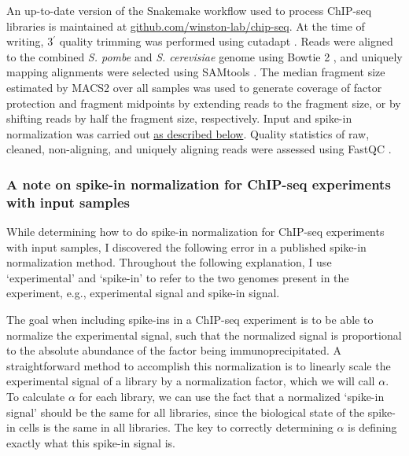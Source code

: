 An up-to-date version of the Snakemake \citep{koster2012} workflow used to process ChIP-seq libraries is maintained at \href{https://github.com/winston-lab/chip-seq}{github.com/winston-lab/chip-seq}.
At the time of writing, 3$^\prime$ quality trimming was performed using cutadapt \citep{martin2011}.
Reads were aligned to the combined \textit{S. pombe} and \textit{S. cerevisiae} genome using Bowtie 2 \citep{langmead2012}, and uniquely mapping alignments were selected using SAMtools \citep{li2009}.
The median fragment size estimated by MACS2 \citep{zhang2008} over all samples was used to generate coverage of factor protection and fragment midpoints by extending reads to the fragment size, or by shifting reads by half the fragment size, respectively.
Input and spike-in normalization was carried out \hyperref[subsubsec:chip_spikein]{as described below}.
Quality statistics of raw, cleaned, non-aligning, and uniquely aligning reads were assessed using FastQC \citep{andrews2010}.

\subsubsection{A note on spike-in normalization for ChIP-seq experiments with input samples}
\label{subsubsec:chip_spikein}

While determining how to do spike-in normalization for ChIP-seq experiments with input samples, I discovered the following error in a published spike-in normalization method.
Throughout the following explanation, I use `experimental' and `spike-in' to refer to the two genomes present in the experiment, e.g., experimental signal and spike-in signal.

The goal when including spike-ins in a ChIP-seq experiment is to be able to normalize the experimental signal, such that the normalized signal is proportional to the absolute abundance of the factor being immunoprecipitated.
A straightforward method to accomplish this normalization is to linearly scale the experimental signal of a library by a normalization factor, which we will call $\alpha$.
To calculate $\alpha$ for each library, we can use the fact that a normalized `spike-in signal' should be the same for all libraries, since the biological state of the spike-in cells is the same in all libraries.
The key to correctly determining $\alpha$ is defining exactly what this spike-in signal is.

